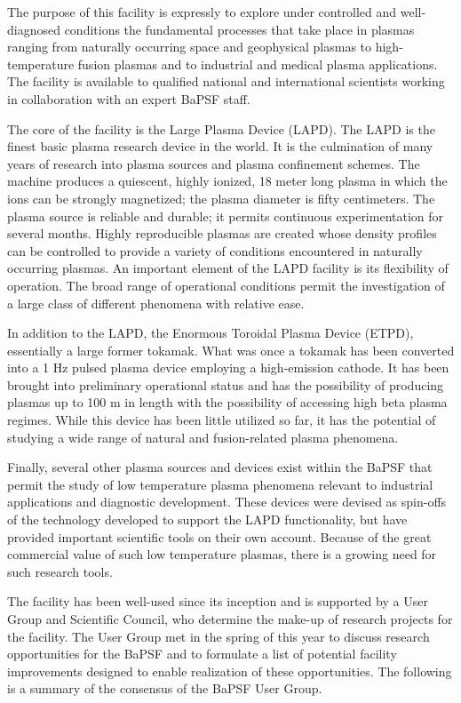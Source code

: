 \documentclass[11pt]{article}
\begin{document}
The purpose of this facility is expressly to explore under controlled and well-diagnosed
conditions the fundamental processes that take place in plasmas ranging from naturally
occurring space and geophysical plasmas to high-temperature fusion plasmas and to
industrial and medical plasma applications. The facility is available to qualified national
and international scientists working in collaboration with an expert BaPSF staff.

The core of the facility is the Large Plasma Device (LAPD). The LAPD is the finest
basic plasma research device in the world. It is the culmination of many years of
research into plasma sources and plasma confinement schemes. The machine produces a
quiescent, highly ionized, 18 meter long plasma in which the ions can be strongly
magnetized; the plasma diameter is fifty centimeters. The plasma source is reliable and
durable; it permits continuous experimentation for several months. Highly reproducible
plasmas are created whose density profiles can be controlled to provide a variety of
conditions encountered in naturally occurring plasmas. An important element of the
LAPD facility is its flexibility of operation. The broad range of operational conditions
permit the investigation of a large class of different phenomena with relative ease.

In addition to the LAPD, the Enormous Toroidal Plasma Device (ETPD), essentially a
large former tokamak. What was once a tokamak has been converted into a 1 Hz pulsed
plasma device employing a high-emission cathode. It has been brought into preliminary
operational status and has the possibility of producing plasmas up to 100 m in length
with the possibility of accessing high beta plasma regimes. While this device has been
little utilized so far, it has the potential of studying a wide range of natural and fusion-related
plasma phenomena.

Finally, several other plasma sources and devices exist within the BaPSF that permit the
study of low temperature plasma phenomena relevant to industrial applications and
diagnostic development. These devices were devised as spin-offs of the technology
developed to support the LAPD functionality, but have provided important scientific
tools on their own account. Because of the great commercial value of such low
temperature plasmas, there is a growing need for such research tools.

The facility has been well-used since its inception and is supported by a User Group and
Scientific Council, who determine the make-up of research projects for the facility. The
User Group met in the spring of this year to discuss research opportunities for the
BaPSF and to formulate a list of potential facility improvements designed to enable
realization of these opportunities. The following is a summary of the consensus of the
BaPSF User Group.
\end{document}
